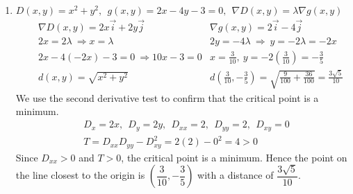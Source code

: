 \documentclass[12pt]{amsart}
\begin{document}
\begin{enumerate}
	\item $D(x,y)=x^2+y^2, \ \ g(x,y)=2x-4y-3=0, \ \ \nabla D(x,y)=\lambda \nabla g(x,y)$
	\begin{align*}
		\ \ \ \ &\nabla D(x,y)=2x\vec{i}+2y\vec{j} &\nabla g(x,y)=2\vec{i}-4\vec{j}\\
		&2x=2\lambda \ \Rightarrow x=\lambda &2y=-4\lambda \ \Rightarrow \ y=-2\lambda=-2x \\
		&2x-4(-2x)-3=0 \ \Rightarrow 10x-3=0 &x=\frac{3}{10}, \ y=-2\left(\frac{3}{10}\right)=-\frac{3}{5} \\
	&d(x,y)=\sqrt{x^2+y^2} &d\left(\frac{3}{10},-\frac{3}{5}\right)=\sqrt{\frac{9}{100}+\frac{36}{100}}=\frac{3\sqrt{5}}{10}
	\end{align*}
	We use the second derivative test to confirm that the critical point is a minimum.
	\begin{align*}
		&D_x=2x, \ \ D_y=2y, \ \ D_{xx}=2, \ \ D_{yy}=2, \ \ D_{xy}=0 \\
		&T=D_{xx}D_{yy}-D^2_{xy}=2(2)-0^2=4>0
	\end{align*}
	Since $D_{xx}>0$ and $T>0$, the critical point is a minimum. Hence the point on the line closest to the origin is $\left(\dfrac{3}{10},-\dfrac{3}{5}\right)$ with a distance of $\dfrac{3\sqrt{5}}{10}$.
					
\end{enumerate}
\end{document}
